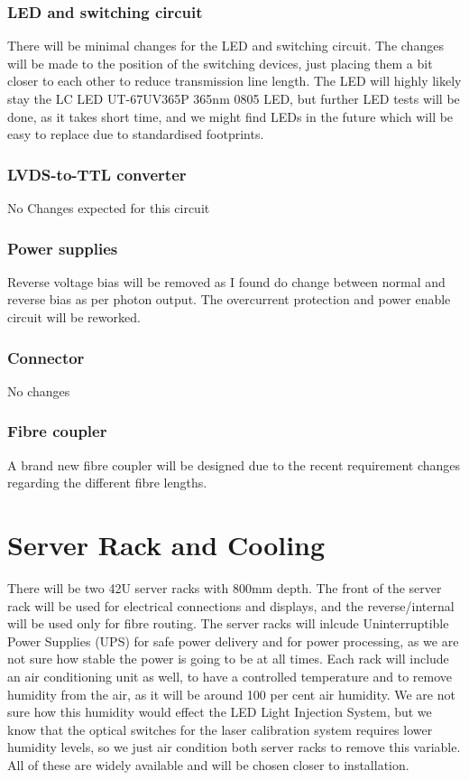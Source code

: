 \documentclass[a4paper,11pt]{article}
\begin{document}
\subsubsection{LED and switching circuit}

There will be minimal changes for the LED and switching circuit. The changes will be made to the position of the switching devices, just placing them a bit closer to each other to reduce transmission line length. The LED will highly likely stay the LC LED UT-67UV365P 365nm 0805 LED, but further LED tests will be done, as it takes short time, and we might find LEDs in the future which will be easy to replace due to standardised footprints.

\subsubsection{LVDS-to-TTL converter}

No Changes expected for this circuit

\subsubsection{Power supplies}

Reverse voltage bias will be removed as I found do change between normal and reverse bias as per photon output. The overcurrent protection and power enable circuit will be reworked.

\subsubsection{Connector}

No changes

\subsubsection{Fibre coupler}

A brand new fibre coupler will be designed due to the recent requirement changes regarding the different fibre lengths.



\section{Server Rack and Cooling}

There will be two 42U server racks with 800mm depth. The front of the server rack will be used for electrical connections and displays, and the reverse/internal will be used only for fibre routing. The server racks will inlcude Uninterruptible Power Supplies (UPS) for safe power delivery and for power processing, as we are not sure how stable the power is going to be at all times. Each rack will include an air conditioning unit as well, to have a controlled temperature and to remove humidity from the air, as it will be around 100 per cent air humidity. We are not sure how this humidity would effect the LED Light Injection System, but we know that the optical switches for the laser calibration system requires lower humidity levels, so we just air condition both server racks to remove this variable. All of these are widely available and will be chosen closer to installation.
\end{document}
